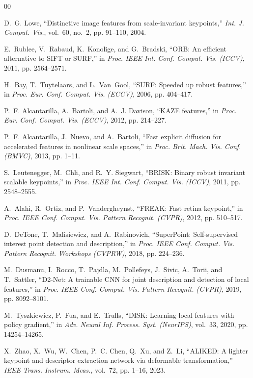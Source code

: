 \documentclass[conference]{IEEEtran}
\begin{document}
\begin{thebibliography}{00}

D.~G. Lowe, ``Distinctive image features from scale-invariant keypoints,'' \textit{Int. J. Comput. Vis.}, vol.~60, no.~2, pp. 91--110, 2004.

E.~Rublee, V.~Rabaud, K.~Konolige, and G.~Bradski, ``ORB: An efficient alternative to SIFT or SURF,'' in \textit{Proc. IEEE Int. Conf. Comput. Vis. (ICCV)}, 2011, pp. 2564--2571.

H.~Bay, T.~Tuytelaars, and L.~Van~Gool, ``SURF: Speeded up robust features,'' in \textit{Proc. Eur. Conf. Comput. Vis. (ECCV)}, 2006, pp. 404--417.

P.~F. Alcantarilla, A.~Bartoli, and A.~J. Davison, ``KAZE features,'' in \textit{Proc. Eur. Conf. Comput. Vis. (ECCV)}, 2012, pp. 214--227.

P.~F. Alcantarilla, J.~Nuevo, and A.~Bartoli, ``Fast explicit diffusion for accelerated features in nonlinear scale spaces,'' in \textit{Proc. Brit. Mach. Vis. Conf. (BMVC)}, 2013, pp. 1--11.

S.~Leutenegger, M.~Chli, and R.~Y. Siegwart, ``BRISK: Binary robust invariant scalable keypoints,'' in \textit{Proc. IEEE Int. Conf. Comput. Vis. (ICCV)}, 2011, pp. 2548--2555.

A.~Alahi, R.~Ortiz, and P.~Vandergheynst, ``FREAK: Fast retina keypoint,'' in \textit{Proc. IEEE Conf. Comput. Vis. Pattern Recognit. (CVPR)}, 2012, pp. 510--517.

D.~DeTone, T.~Malisiewicz, and A.~Rabinovich, ``SuperPoint: Self-supervised interest point detection and description,'' in \textit{Proc. IEEE Conf. Comput. Vis. Pattern Recognit. Workshops (CVPRW)}, 2018, pp. 224--236.

M.~Dusmanu, I.~Rocco, T.~Pajdla, M.~Pollefeys, J.~Sivic, A.~Torii, and T.~Sattler, ``D2-Net: A trainable CNN for joint description and detection of local features,'' in \textit{Proc. IEEE Conf. Comput. Vis. Pattern Recognit. (CVPR)}, 2019, pp. 8092--8101.

M.~Tyszkiewicz, P.~Fua, and E.~Trulls, ``DISK: Learning local features with policy gradient,'' in \textit{Adv. Neural Inf. Process. Syst. (NeurIPS)}, vol.~33, 2020, pp. 14254--14265.

X.~Zhao, X.~Wu, W.~Chen, P.~C. Chen, Q.~Xu, and Z.~Li, ``ALIKED: A lighter keypoint and descriptor extraction network via deformable transformation,'' \textit{IEEE Trans. Instrum. Meas.}, vol.~72, pp. 1--16, 2023.


\end{thebibliography}
\end{document}
